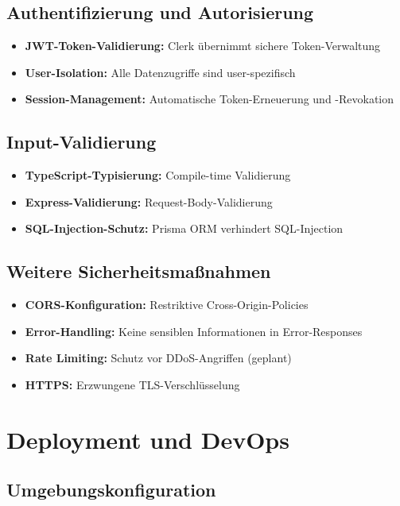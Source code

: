 \subsection{Authentifizierung und Autorisierung}

\begin{itemize}
    \item \textbf{JWT-Token-Validierung:} Clerk übernimmt sichere Token-Verwaltung
    \item \textbf{User-Isolation:} Alle Datenzugriffe sind user-spezifisch
    \item \textbf{Session-Management:} Automatische Token-Erneuerung und -Revokation
\end{itemize}

\subsection{Input-Validierung}

\begin{itemize}
    \item \textbf{TypeScript-Typisierung:} Compile-time Validierung
    \item \textbf{Express-Validierung:} Request-Body-Validierung
    \item \textbf{SQL-Injection-Schutz:} Prisma ORM verhindert SQL-Injection
\end{itemize}

\subsection{Weitere Sicherheitsmaßnahmen}

\begin{itemize}
    \item \textbf{CORS-Konfiguration:} Restriktive Cross-Origin-Policies
    \item \textbf{Error-Handling:} Keine sensiblen Informationen in Error-Responses
    \item \textbf{Rate Limiting:} Schutz vor DDoS-Angriffen (geplant)
    \item \textbf{HTTPS:} Erzwungene TLS-Verschlüsselung
\end{itemize}

\section{Deployment und DevOps}

\subsection{Umgebungskonfiguration}

